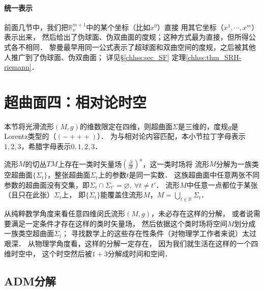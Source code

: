 \paragraph{统一表示}
前面几节中，我们把$\mathbb{R}^{m+1}_\nu$中的某个坐标（比如$x^0$）直接
用其它坐标（$x^1,\cdots,x^m$）表示出来，
然后给出了伪球面、伪双曲面的度规；这种方式最为直接，但所得公式各不相同．
黎曼最早用同一公式表示了超球面和双曲空间的度规，之后被其他人推广到了伪球面、伪双曲面；
详见\S \ref{chhss:sec_SF} 定理\ref{chhss:thm_SRH-riemann}．




\section{超曲面四：相对论时空}\label{chsm:sec_3+1decomposition}
本节将光滑流形$(M,g)$的维数限定在四维，则超曲面$\Sigma$是三维的，度规$g$是Lorentz类型的（$(-+++)$）．
为与相对论内容匹配，本小节拉丁字母表示$1,2,3$，希腊字母表示$0,1,2,3$．


流形$M$的切丛$TM$上存在一类时矢量场$(\frac{\partial }{\partial t})^a$，这一类时场将
流形$M$分解为一族类空超曲面$\{\Sigma_t\}$，整张超曲面$\Sigma_t$上的参数$t$是同一实数．
这族超曲面中任意两张不同参数的超曲面没有交集，即$\Sigma_t \cap \Sigma_{t'}=\varnothing,
\ \forall t \neq t' $．
流形$M$中任意一点都位于某张（且只在此张）$\Sigma_t$上，
即$\{\Sigma_t\}$能覆盖住流形$M$，$M=\bigcup_{t\in\mathbb{R}} \Sigma_t$．

从纯粹数学角度来看任意四维闵氏流形$(M,g)$，未必存在这样的分解，
或者说需要满足一定条件才存在这样的类时矢量场，
然后依据这个类时场将空间$M$划分成一族类空超曲面$\Sigma_t$；
寻找数学上的这些存在性条件（对物理学工作者来说）太过艰深．
从物理学角度看，这样的分解一定存在，
因为我们就生活在这样的一个四维时空中，
这个时空然后被$1+3$分解成时间和空间．




\subsection{ADM分解}\label{chsm:sec_ADM}

